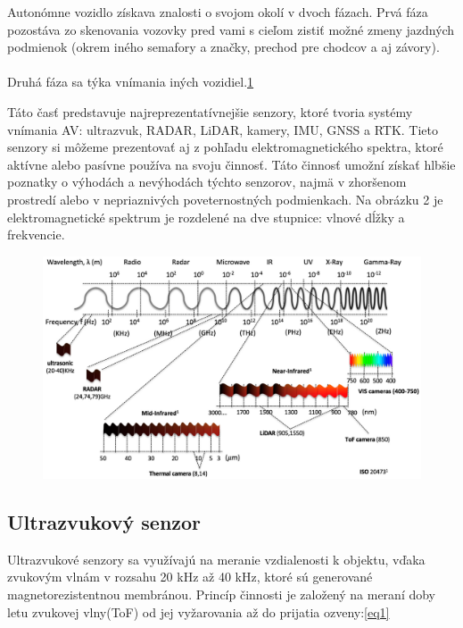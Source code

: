 \documentclass[10pt,oneside,slovak,a4paper]{article}
\begin{document}
\par Autonómne vozidlo získava znalosti o svojom okolí v dvoch fázach. Prvá fáza pozostáva zo skenovania vozovky pred vami s cieľom zistiť možné zmeny jazdných podmienok (okrem iného semafory a značky, prechod pre chodcov a aj závory).\cite{s19030648} 
\\~\\
Druhá fáza sa týka vnímania iných vozidiel.\ref{fig:senzory}
\par Táto časť predstavuje najreprezentatívnejšie senzory, ktoré tvoria systémy vnímania AV: ultrazvuk, RADAR, LiDAR, kamery, IMU, GNSS a RTK. Tieto senzory si môžeme prezentovať aj z pohľadu elektromagnetického spektra, ktoré aktívne alebo pasívne používa na svoju činnosť. Táto činnosť umožní získať hlbšie poznatky o výhodách a nevýhodách týchto senzorov, najmä v zhoršenom prostredí alebo v nepriaznivých poveternostných podmienkach. Na obrázku 2 je elektromagnetické spektrum je rozdelené na dve stupnice: vlnové dĺžky a frekvencie. \cite{s19030648 }

\begin{figure}[!h]
\centering
\includegraphics[scale=0.7]{senzory.png}
\label{fig:senzory}
\end{figure}


\newpage
\subsection{Ultrazvukový senzor}\label{viditelnot}

Ultrazvukové senzory sa využívajú na meranie vzdialenosti k objektu, vďaka zvukovým vlnám v rozsahu 20 kHz až 40 kHz, ktoré sú generované magnetorezistentnou membránou. Princíp činnosti je založený na meraní doby letu zvukovej vlny(ToF) od jej vyžarovania až do prijatia ozveny:\ref{eq1}
\end{document}
